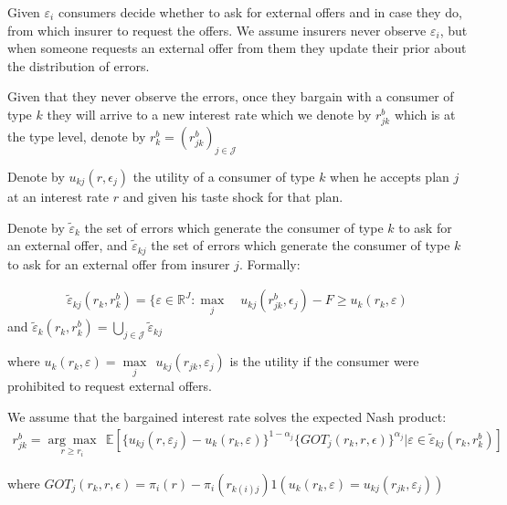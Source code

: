 \documentclass[12pt]{article}
\theoremstyle{plain}
\theoremstyle{plain}
\begin{document}
Given $\varepsilon_i$ consumers decide whether to ask for external offers and in case they do, from which insurer to request the offers. We assume insurers never observe $\varepsilon_i$, but when someone requests an external offer from them they update their prior about the distribution of errors. 

Given that they never observe the errors, once they bargain with a consumer of type $k$ they will arrive to a new interest rate which we denote by $r_{jk}^b$ which is at the type level, denote by $r_{k}^b= (r_{jk}^b)_{j\in \mathcal{J}}$

Denote by $u_{kj}(r,\epsilon_j)$ the utility of a consumer of type $k$ when he accepts plan $j$ at an interest rate $r$ and given his taste shock for that plan. 


Denote by $\tilde{\varepsilon}_{k}$ the set of errors which generate the consumer of type $k$ to ask for an external offer, and $\tilde{\varepsilon}_{kj}$ the set of errors which generate the consumer of type $k$ to ask for an external offer from insurer $j$. Formally: 

\begin{align}
    \tilde{\varepsilon}_{kj}(r_k, r_{k}^b) = \{ \varepsilon \in \mathbb{R}^J: \underset{j}{\max} \quad u_{kj}(r_{jk}^b, \epsilon_j) - F \geq u_{k}(r_k, \varepsilon) 
\end{align}
and $\tilde{\varepsilon}_{k}(r_k, r_{k}^b) = \bigcup_{j\in \mathcal{J}} \tilde{\varepsilon}_{kj}  $

where $u_{k}(r_k, \varepsilon) = \underset{j}{\max} \ \ u_{kj}(r_{jk}, \varepsilon_j)$ is the utility if the consumer were prohibited to request external offers. 

We assume that the bargained interest rate solves the expected Nash product:  
\begin{align}\label{eq:bargaining}
    r_{jk}^b = \underset{r\geq r_i}{\arg \max} \ \  \mathbb{E}\left[
    \{u_{kj}(r, \varepsilon_j) -u_{k}(r_k, \varepsilon)\} ^{1-\alpha_j} 
    \{GOT_j(r_k, r, \epsilon) \}^{\alpha_j}
    | \varepsilon \in \tilde{\varepsilon}_{kj}(r_k, r_{k}^b)
    \right] 
\end{align}

where $GOT_j(r_k, r, \epsilon) = \pi_i(r)-\pi_i(r_{k(i)j}) 1( u_k(r_k, \varepsilon) = u_{kj}(r_{jk}, \varepsilon_j))$

\end{document}
